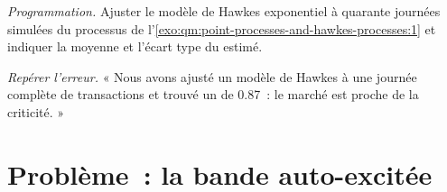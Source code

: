 \begin{exercise}[$\star\star\star$]\label{exo:qm:point-processes-and-hawkes-processes:7}
\emph{Programmation.} Ajuster le modèle de Hawkes exponentiel à quarante journées simulées du processus de
l'\cref{exo:qm:point-processes-and-hawkes-processes:1} et indiquer la moyenne et l'écart type
du  estimé.
\end{exercise}

\begin{exercise}[$\star\star\star$]\label{exo:qm:point-processes-and-hawkes-processes:8}
\emph{Repérer l'erreur.} « Nous avons ajusté un modèle de Hawkes à une journée complète de transactions et trouvé un  de 0.87~:
le marché est proche de la criticité. »
\end{exercise}

\section{Problème~: la bande auto-excitée}

